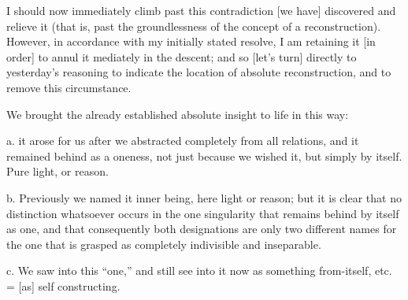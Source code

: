 I should now immediately climb past this
contradiction [we have] discovered and relieve it
(that is, past the groundlessness of
the concept of a reconstruction).
However, in accordance with my initially stated resolve,
I am retaining it [in order] to annul it mediately in the descent;
and so [let's turn] directly to yesterday's reasoning
to indicate the location of absolute reconstruction,
and to remove this circumstance.

We brought the already established absolute insight
to life in this way:

a. it arose for us after
we abstracted completely from all relations,
and it remained behind as a oneness,
not just because we wished it,
but simply by itself.
Pure light, or reason.

b. Previously we named it inner being,
here light or reason;
but it is clear that no distinction whatsoever occurs
in the one singularity that remains behind by itself as one,
and that consequently both designations are only
two different names for the one
that is grasped as completely
indivisible and inseparable.

c. We saw into this “one,”
and still see into it now as
something from-itself,
etc. = [as] self constructing.

